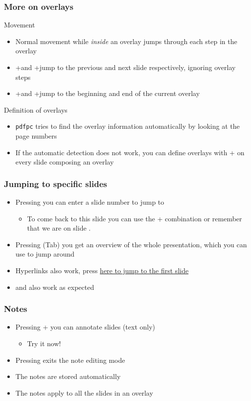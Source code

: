 \documentclass{beamer}
\newcommand{\singleitem}[1]{\begin{itemize}\item #1\end{itemize}}
\newcommand{\pdfpc}{\texttt{pdfpc}\xspace}
\begin{document}
\begin{frame}
  \frametitle{More on overlays}
  \begin{block}{Movement}
    \begin{itemize}
      \item Normal movement while \emph{inside} an overlay jumps through each
        step in the overlay
      \item \Shift+\PgUp and \Shift+\PgDown jump to the previous and next slide
        respectively, ignoring overlay steps
      \item \Shift+\UArrow and \Shift+\DArrow jump to the beginning and end
        of the current overlay
    \end{itemize}
  \end{block}
  \begin{block}{Definition of overlays}
    \begin{itemize}
      \item \pdfpc tries to find the overlay information automatically by
        looking at the page numbers
      \item If the automatic detection does not work, you can define overlays
        with \Ctrl+ on every slide composing an overlay
    \end{itemize}
  \end{block}
\end{frame}

\begin{frame}
  \frametitle{Jumping to specific slides}
  \begin{itemize}
    \item Pressing  you can enter a slide number to jump to
      \singleitem{To come back to this slide you can use the \Shift+\BSpace
        combination or remember that we are on slide \insertframenumber.}
    \item Pressing \Tab (Tab) you get an overview of the whole presentation,
      which you can use to jump around
    \item Hyperlinks also work, press \hyperlink{titlePage}{here to jump to the
      first slide}
    \item \Home and \End also work as expected
  \end{itemize}
\end{frame}

\begin{frame}
  \frametitle{Notes}
  \begin{itemize}
    \item Pressing \Ctrl+ you can annotate slides (text only)
      \singleitem{Try it now!}
    \item Pressing \Esc exits the note editing mode
    \item The notes are stored automatically
    \item The notes apply to all the slides in an overlay
  \end{itemize}
\end{frame}
\end{document}
